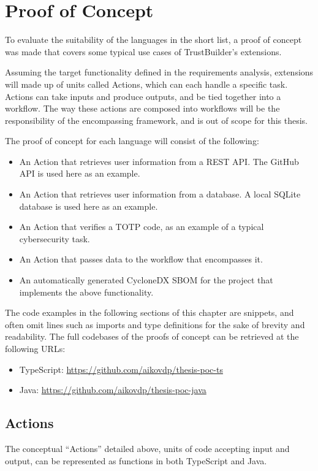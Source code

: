\chapter{Proof of Concept}
\label{ch:proof-of-concept}
To evaluate the suitability of the languages in the short list, a proof of concept was made that covers some typical use cases of TrustBuilder's extensions. 

Assuming the target functionality defined in the requirements analysis, extensions will made up of units called Actions, which can each handle a specific task. Actions can take inputs and produce outputs, and be tied together into a workflow. The way these actions are composed into workflows will be the responsibility of the encompassing framework, and is out of scope for this thesis.

The proof of concept for each language will consist of the following:
\begin{itemize}
    \item An Action that retrieves user information from a REST API. The GitHub API is used here as an example.
    \item An Action that retrieves user information from a database. A local SQLite database is used here as an example.
    \item An Action that verifies a TOTP code, as an example of a typical cybersecurity task.
    \item An Action that passes data to the workflow that encompasses it.
    \item An automatically generated CycloneDX SBOM for the project that implements the above functionality.
\end{itemize}

The code examples in the following sections of this chapter are snippets, and often omit lines such as imports and type definitions for the sake of brevity and readability. The full codebases of the proofs of concept can be retrieved at the following URLs:
\begin{itemize}
    \item TypeScript: \url{https://github.com/aikovdp/thesis-poc-ts}
    \item Java: \url{https://github.com/aikovdp/thesis-poc-java}
\end{itemize} 

\section{Actions}
The conceptual ``Actions'' detailed above, units of code accepting input and output, can be represented as functions in both TypeScript and Java. 


